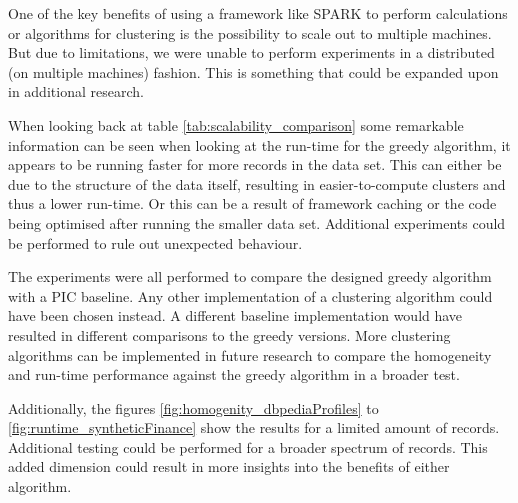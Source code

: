 One of the key benefits of using a framework like SPARK to perform calculations or algorithms for clustering is the possibility to scale out to multiple machines. But due to limitations, we were unable to perform experiments in a distributed (on multiple machines) fashion. This is something that could be expanded upon in additional research.

When looking back at table \ref{tab:scalability_comparison} some remarkable information can be seen when looking at the run-time for the greedy algorithm, it appears to be running faster for more records in the data set. This can either be due to the structure of the data itself, resulting in easier-to-compute clusters and thus a lower run-time. Or this can be a result of framework caching or the code being optimised after running the smaller data set. Additional experiments could be performed to rule out unexpected behaviour. 

The experiments were all performed to compare the designed greedy algorithm with a PIC baseline. Any other implementation of a clustering algorithm could have been chosen instead. A different baseline implementation would have resulted in different comparisons to the greedy versions. More clustering algorithms can be implemented in future research to compare the homogeneity and run-time performance against the greedy algorithm in a broader test.

Additionally, the figures \ref{fig:homogenity_dbpediaProfiles} to \ref{fig:runtime_syntheticFinance} show the results for a limited amount of records. Additional testing could be performed for a broader spectrum of records. This added dimension could result in more insights into the benefits of either algorithm.